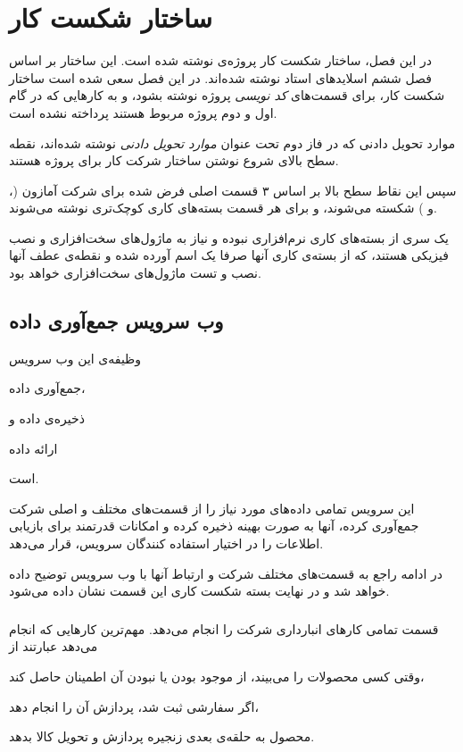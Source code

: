 \chapter{ساختار شکست کار}
در این فصل، ساختار شکست کار پروژه‌ی
نوشته شده است. این ساختار بر اساس فصل ششم اسلاید‌های استاد نوشته شده‌اند. در این فصل سعی شده است ساختار شکست کار، برای قسمت‌های \textit{کد نویسی} پروژه نوشته بشود، و به کارهایی که در گام اول و دوم پروژه مربوط هستند پرداخته نشده ‌است.

موارد تحویل دادنی که در فاز دوم تحت عنوان \textit{موارد تحویل دادنی} نوشته شده‌اند، نقطه سطح بالای شروع نوشتن ساختار شرکت کار برای پروژه 
هستند.

سپس این نقاط سطح بالا بر اساس ۳ قسمت اصلی فرض شده برای شرکت آمازون (،  و ) شکسته می‌شوند، و برای هر قسمت بسته‌های کاری کوچک‌تری نوشته می‌شوند.

یک سری از بسته‌های کاری نرم‌افزاری نبوده و نیاز به ماژول‌های سخت‌افزاری و نصب فیزیکی هستند، که از بسته‌ی کاری آنها صرفا یک اسم آورده شده و نقطه‌ی عطف آنها نصب و تست ماژول‌‌های سخت‌افزاری خواهد بود.


\section{وب سرویس جمع‌آوری داده}\label{sec:gatherer}
وظیفه‌ی این وب سرویس
\begin{enumerate*}
\item 
جمع‌آوری داده،
\item 
ذخیره‌ی داده و
\item 
ارائه داده
\end{enumerate*}
است.

این سرویس تمامی داده‌های مورد نیاز را از قسمت‌های مختلف و اصلی شرکت جمع‌آوری کرده، آنها به صورت بهینه ذخیره کرده و امکانات قدرتمند برای بازیابی اطلاعات را در اختیار استفاده کنندگان سرویس، قرار می‌دهد.

در ادامه راجع به قسمت‌های مختلف شرکت و ارتباط آنها با وب سرویس توضیح داده خواهد شد و در نهایت بسته شکست کاری این قسمت نشان داده می‌شود.

\subsection{}\label{ssec:stock}
قسمت  تمامی کار‌‌های انبار‌داری شرکت را انجام می‌دهد. مهم‌ترین کار‌هایی که انجام می‌دهد عبارتند از
\begin{enumerate*}
\item 
وقتی کسی محصولات را می‌بیند، از موجود بودن یا نبودن‌ آن اطمینان حاصل کند،
\item 
اگر سفارشی ثبت شد، پردازش آن را انجام دهد،

\item 
محصول به حلقه‌ی بعدی زنجیره پردازش و تحویل کالا بدهد.
\end{enumerate*}

